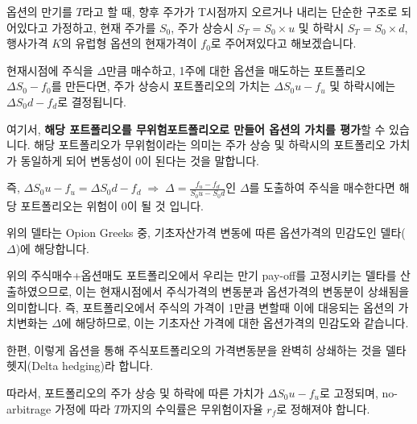 \documentclass[
  letterpaper,
  DIV=11,
  numbers=noendperiod]{scrreprt}
\begin{document}

옵션의 만기를 \(T\)라고 할 때, 향후 주가가 T시점까지 오르거나 내리는
단순한 구조로 되어있다고 가정하고, 현재 주가를 \(S_0\), 주가 상승시
\(S_T=S_0\times u\) 및 하락시 \(S_T=S_0\times d\), 행사가격 \(K\)의
유럽형 옵션의 현재가격이 \(f_0\)로 주어져있다고 해보겠습니다.

현재시점에 주식을 \(\Delta\)만큼 매수하고, 1주에 대한 옵션을 매도하는
포트폴리오 \(\Delta S_0-f_0\)를 만든다면, 주가 상승시 포트폴리오의
가치는 \(\Delta S_0u-f_u\) 및 하락시에는 \(\Delta S_0d-f_d\)로
결정됩니다.

여기서, \textbf{해당 포트폴리오를 무위험포트폴리오로 만들어 옵션의
가치를 평가}할 수 있습니다. 해당 포트폴리오가 무위험이라는 의미는 주가
상승 및 하락시의 포트폴리오 가치가 동일하게 되어 변동성이 0이 된다는
것을 말합니다.

즉,
\(\Delta S_0u-f_u=\Delta S_0d-f_d\;\Rightarrow\;\Delta=\frac{f_u-f_d}{S_0u-S_0d}\)인
\(\Delta\)를 도출하여 주식을 매수한다면 해당 포트폴리오는 위험이 0이 될
것 입니다.

\begin{tcolorbox}[enhanced jigsaw, titlerule=0mm, bottomtitle=1mm, left=2mm, title=\textcolor{quarto-callout-tip-color}{\faLightbulb}\hspace{0.5em}{13.6 Options Delta}, toptitle=1mm, bottomrule=.15mm, colframe=quarto-callout-tip-color-frame, breakable, opacityback=0, rightrule=.15mm, opacitybacktitle=0.6, coltitle=black, colback=white, arc=.35mm, colbacktitle=quarto-callout-tip-color!10!white, toprule=.15mm, leftrule=.75mm]

위의 델타는 Opion Greeks 중, 기초자산가격 변동에 따른 옵션가격의
민감도인 델타(\(\Delta\))에 해당합니다.

위의 주식매수+옵션매도 포트폴리오에서 우리는 만기 pay-off를 고정시키는
델타를 산출하였으므로, 이는 현재시점에서 주식가격의 변동분과 옵션가격의
변동분이 상쇄됨을 의미합니다. 즉, 포트폴리오에서 주식의 가격이 1만큼
변할때 이에 대응되는 옵션의 가치변화는 \(\Delta\)에 해당하므로, 이는
기초자산 가격에 대한 옵션가격의 민감도와 같습니다.

한편, 이렇게 옵션을 통해 주식포트폴리오의 가격변동분을 완벽히 상쇄하는
것을 델타헷지(Delta hedging)라 합니다.

\end{tcolorbox}

따라서, 포트폴리오의 주가 상승 및 하락에 따른 가치가
\(\Delta S_0u-f_u\)로 고정되며, no-arbitrage 가정에 따라 \(T\)까지의
수익률은 무위험이자율 \(r_f\)로 정해져야 합니다.
\end{document}
